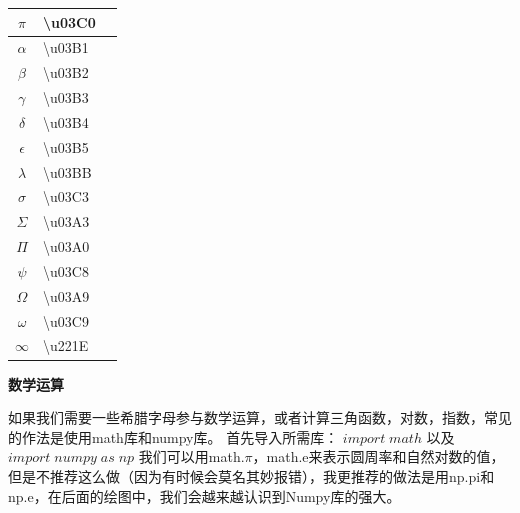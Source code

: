 \documentclass[12pt]{article}
\begin{document}
\begin{table}[H]
\centering
\begin{tabularx}{0.5\textwidth}{|c|>{\centering\arraybackslash}X|X|}
\hline
$\pi$                                                   & \textbackslash{}u03C0 \\ \hline
$\alpha$                                                & \textbackslash{}u03B1 \\ \hline
$\beta$                                                 & \textbackslash{}u03B2 \\ \hline
$\gamma$                                                & \textbackslash{}u03B3 \\ \hline
$\delta$                                                & \textbackslash{}u03B4 \\ \hline
$\epsilon$                                              & \textbackslash{}u03B5 \\ \hline
$\lambda$                                               & \textbackslash{}u03BB \\ \hline
$\sigma$                                                & \textbackslash{}u03C3 \\ \hline
$\Sigma$                                                & \textbackslash{}u03A3 \\ \hline
$\Pi$                                                   & \textbackslash{}u03A0 \\ \hline
$\psi$                                                  & \textbackslash{}u03C8 \\ \hline
$\Omega$                                                & \textbackslash{}u03A9 \\ \hline
$\omega$                                                & \textbackslash{}u03C9 \\ \hline
$\infty$                                                  & \textbackslash{}u221E \\ \hline
\end{tabularx}
\end{table}

\noindent \textbf{\large 数学运算}

如果我们需要一些希腊字母参与数学运算，或者计算三角函数，对数，指数，常见的作法是使用math库和numpy库。
首先导入所需库： \(import\; math\) 以及 \(import\; numpy\; as\; np  \)
我们可以用math.$\pi$，math.e来表示圆周率和自然对数的值，但是不推荐这么做（因为有时候会莫名其妙报错），我更推荐的做法是用np.pi和np.e，在后面的绘图中，我们会越来越认识到Numpy库的强大。
\end{document}
